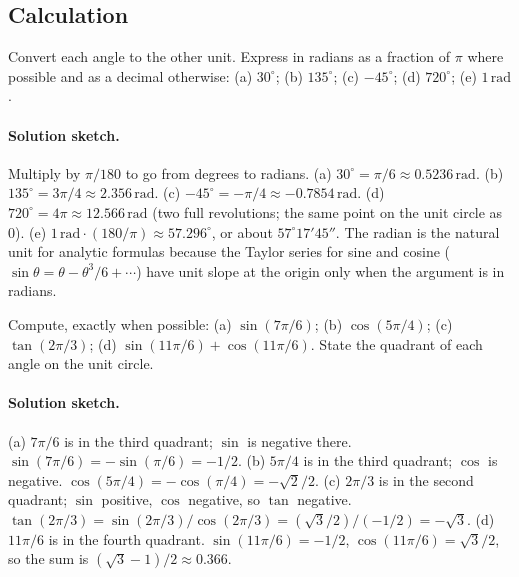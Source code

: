 \subsection*{Calculation}

\begin{exercise}
Convert each angle to the other unit. Express in radians as a
fraction of $\pi$ where possible and as a decimal otherwise: (a)
$30^{\circ}$; (b) $135^{\circ}$; (c) $-45^{\circ}$; (d) $720^{\circ}$;
(e) $1 \,\text{rad}$.

\paragraph{Solution sketch.}
Multiply by $\pi/180$ to go from degrees to radians.
(a) $30^{\circ} = \pi/6 \approx 0.5236\,\text{rad}$.
(b) $135^{\circ} = 3\pi/4 \approx 2.356\,\text{rad}$.
(c) $-45^{\circ} = -\pi/4 \approx -0.7854\,\text{rad}$.
(d) $720^{\circ} = 4\pi \approx 12.566\,\text{rad}$ (two full
revolutions; the same point on the unit circle as $0$).
(e) $1\,\text{rad} \cdot (180/\pi) \approx 57.296^{\circ}$, or
about $57^{\circ}17'45''$. The radian is the natural unit for
analytic formulas because the Taylor series for sine and cosine
($\sin\theta = \theta - \theta^{3}/6 + \cdots$) have unit slope
at the origin only when the argument is in radians.
\end{exercise}

\begin{exercise}
Compute, exactly when possible: (a) $\sin(7\pi/6)$; (b) $\cos(5\pi/4)$;
(c) $\tan(2\pi/3)$; (d) $\sin(11\pi/6) + \cos(11\pi/6)$. State the
quadrant of each angle on the unit circle.

\paragraph{Solution sketch.}
(a) $7\pi/6$ is in the third quadrant; $\sin$ is negative there.
$\sin(7\pi/6) = -\sin(\pi/6) = -1/2$.
(b) $5\pi/4$ is in the third quadrant; $\cos$ is negative.
$\cos(5\pi/4) = -\cos(\pi/4) = -\sqrt{2}/2$.
(c) $2\pi/3$ is in the second quadrant; $\sin$ positive, $\cos$
negative, so $\tan$ negative. $\tan(2\pi/3) = \sin(2\pi/3)/\cos(2\pi/3)
= (\sqrt{3}/2)/(-1/2) = -\sqrt{3}$.
(d) $11\pi/6$ is in the fourth quadrant. $\sin(11\pi/6) = -1/2$,
$\cos(11\pi/6) = \sqrt{3}/2$, so the sum is $(\sqrt{3} - 1)/2
\approx 0.366$.
\end{exercise}

